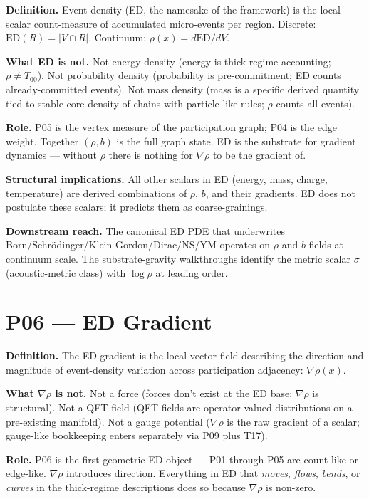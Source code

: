 \documentclass[11pt,a4paper]{article}
\begin{document}
\textbf{Definition.} Event density (ED, the namesake of the framework) is the local scalar count-measure of accumulated micro-events per region. Discrete: $\mathrm{ED}(R) = |V \cap R|$. Continuum: $\rho(x) = d\mathrm{ED}/dV$.

\textbf{What ED is not.} Not energy density (energy is thick-regime accounting; $\rho \neq T_{00}$). Not probability density (probability is pre-commitment; ED counts already-committed events). Not mass density (mass is a specific derived quantity tied to stable-core density of chains with particle-like rules; $\rho$ counts all events).

\textbf{Role.} P05 is the vertex measure of the participation graph; P04 is the edge weight. Together $(\rho, b)$ is the full graph state. ED is the substrate for gradient dynamics --- without $\rho$ there is nothing for $\nabla\rho$ to be the gradient of.

\textbf{Structural implications.} All other scalars in ED (energy, mass, charge, temperature) are derived combinations of $\rho$, $b$, and their gradients. ED does not postulate these scalars; it predicts them as coarse-grainings.

\textbf{Downstream reach.} The canonical ED PDE that underwrites Born/Schr\"odinger/Klein-Gordon/Dirac/NS/YM operates on $\rho$ and $b$ fields at continuum scale. The substrate-gravity walkthroughs identify the metric scalar $\sigma$ (acoustic-metric class) with $\log \rho$ at leading order.

\section{P06 --- ED Gradient}

\textbf{Definition.} The ED gradient is the local vector field describing the direction and magnitude of event-density variation across participation adjacency: $\nabla\rho(x)$.

\textbf{What $\nabla\rho$ is not.} Not a force (forces don't exist at the ED base; $\nabla\rho$ is structural). Not a QFT field (QFT fields are operator-valued distributions on a pre-existing manifold). Not a gauge potential ($\nabla\rho$ is the raw gradient of a scalar; gauge-like bookkeeping enters separately via P09 plus T17).

\textbf{Role.} P06 is the first geometric ED object --- P01 through P05 are count-like or edge-like. $\nabla\rho$ introduces direction. Everything in ED that \emph{moves}, \emph{flows}, \emph{bends}, or \emph{curves} in the thick-regime descriptions does so because $\nabla\rho$ is non-zero.
\end{document}
